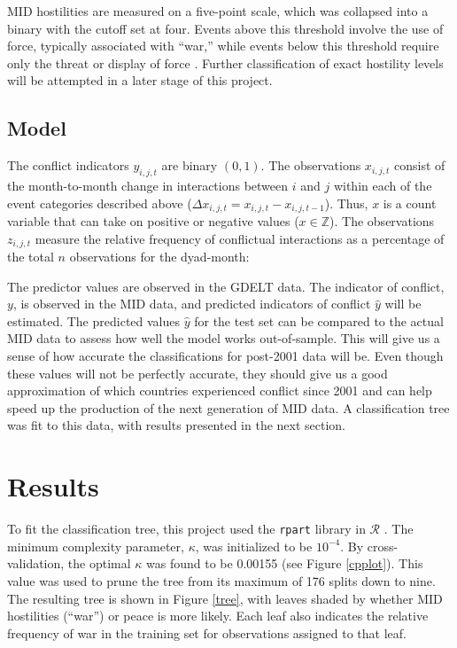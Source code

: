 \documentclass[12pt,letterpaper]{article}
\begin{document}
MID hostilities are measured on a five-point scale, which was collapsed into a binary with the cutoff set at four. Events above this threshold involve the use of force, typically associated with ``war,'' while events below this threshold require only the threat or display of force \citep{ghosn2004mid3}. Further classification of exact hostility levels will be attempted in a later stage of this project. 

\subsection{Model}

The conflict indicators $y_{i,j,t}$ are binary $(0,1)$. The observations $x_{i,j,t}$ consist of the month-to-month change in interactions between $i$ and $j$ within each of the event categories described above ($\Delta x_{i,j,t} = x_{i,j,t} - x_{i,j,t-1}$). Thus, $x$ is a count variable that can take on positive or negative values ($x \in \mathbb{Z}$). The observations $z_{i,j,t}$ measure the relative frequency of conflictual interactions as a percentage of the total $n$ observations for the dyad-month: 

The predictor values are observed in the GDELT data. The indicator of conflict, $y$, is observed in the MID data, and predicted indicators of conflict $\hat{y}$ will be estimated. The predicted values $\hat{y}$ for the test set can be compared to the actual MID data to assess how well the model works out-of-sample. This will give us a sense of how accurate the classifications for post-2001 data will be. Even though these values will not be perfectly accurate, they should give us a good approximation of which countries experienced conflict since 2001 and can help speed up the production of the next generation of MID data. A classification tree was fit to this data, with results presented in the next section.


\section{Results}
\label{results}

To fit the classification tree, this project used the \texttt{rpart} library in $\mathcal{R}$ \citep{therneau1997introduction}. The minimum complexity parameter, $\kappa$, was initialized to be $10^{-4}$. By cross-validation, the optimal $\kappa$ was found to be 0.00155 (see Figure \ref{cpplot}). This value was used to prune the tree from its maximum of 176 splits down to nine. The resulting tree is shown in Figure \ref{tree}, with leaves shaded by whether MID hostilities (``war'') or peace is more likely. Each leaf also indicates the relative frequency of war in the training set for observations assigned to that leaf.
\end{document}
